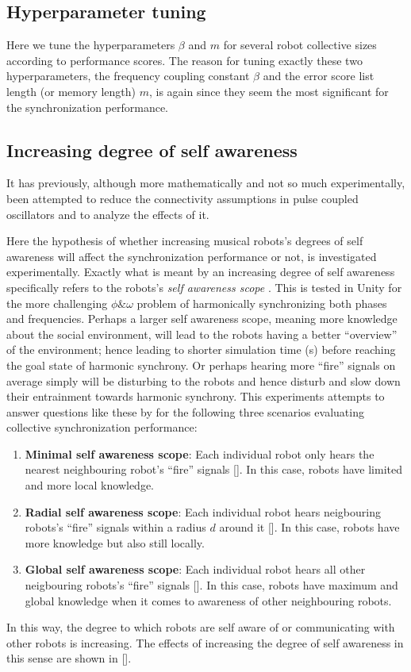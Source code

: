 		
	\subsection{Hyperparameter tuning}
	
	Here we tune the hyperparameters $\beta$ and $m$ for several robot collective sizes according to performance scores. The reason for tuning exactly these two hyperparameters, the frequency coupling constant $\beta$ and the error score list length (or memory length) $m$, is again since they seem the most significant for the synchronization performance.
	
	
	\subsection{Increasing degree of self awareness}
	
	It has previously, although more mathematically and not so much experimentally, been attempted to reduce the connectivity assumptions in pulse coupled oscillators \cite{minimally_connected_pcos} and to analyze the effects of it.
	
	Here the hypothesis of whether increasing musical robots's degrees of self awareness will affect the synchronization performance or not, is investigated experimentally. Exactly what is meant by an increasing degree of self awareness specifically refers to the robots's \textit{self awareness scope} \cite{sacs17_ch3}. This is tested in Unity for the more challenging $\phi \& \omega$ problem of harmonically synchronizing both phases and frequencies. Perhaps a larger self awareness scope, meaning more knowledge about the social environment, will lead to the robots having a better ``overview'' of the environment; hence leading to shorter simulation time (s) before reaching the goal state of harmonic synchrony. Or perhaps hearing more ``fire'' signals on average simply will be disturbing to the robots and hence disturb and slow down their entrainment towards harmonic synchrony. This experiments attempts to answer questions like these by for the following three scenarios evaluating collective synchronization performance:
	
	\begin{enumerate}
		\item \textbf{Minimal self awareness scope}: Each individual robot only hears the nearest neighbouring robot's ``fire'' signals []. In this case, robots have limited and more local knowledge.
		\item \textbf{Radial self awareness scope}: Each individual robot hears neigbouring robots's ``fire'' signals within a radius $d$ around it []. In this case, robots have more knowledge but also still locally.
		\item \textbf{Global self awareness scope}: Each individual robot hears all other neigbouring robots's ``fire'' signals []. In this case, robots have maximum and global knowledge when it comes to awareness of other neighbouring robots.
	\end{enumerate}
	
	In this way, the degree to which robots are self aware of or communicating with other robots is increasing. The effects of increasing the degree of self awareness in this sense are shown in [].
	
